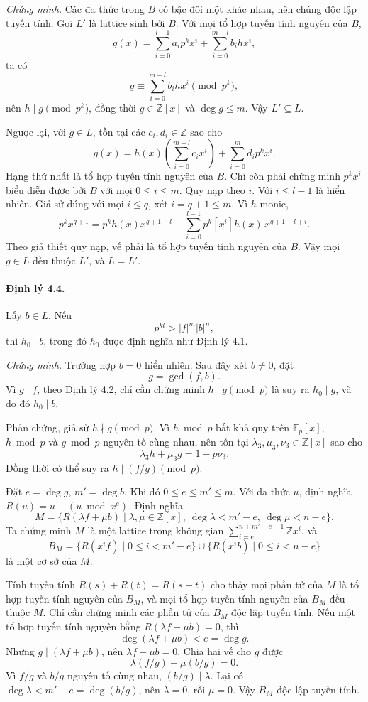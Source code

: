 \documentclass[11pt]{article}
\begin{document}
\emph{Chứng minh.}
Các đa thức trong \(B\) có bậc đôi một khác nhau, nên chúng độc lập tuyến tính.
Gọi \(L'\) là lattice sinh bởi \(B\). Với mọi tổ hợp tuyến tính nguyên của
\(B\),
\[
  g(x)=\sum_{i=0}^{l-1}a_ip^kx^i+\sum_{i=0}^{m-l}b_ihx^i,
\]
ta có
\[
  g\equiv \sum_{i=0}^{m-l}b_ihx^i\pmod {p^k},
\]
nên \(h\mid g\pmod {p^k}\), đồng thời \(g\in\mathbb Z[x]\) và
\(\deg g\le m\). Vậy \(L'\subseteq L\).

Ngược lại, với \(g\in L\), tồn tại các \(c_i,d_i\in\mathbb Z\) sao cho
\[
  g(x)=h(x)\left(\sum_{i=0}^{m-l}c_ix^i\right)+\sum_{i=0}^{m}d_ip^kx^i.
\]
Hạng thứ nhất là tổ hợp tuyến tính nguyên của \(B\). Chỉ còn phải chứng minh
\(p^kx^i\) biểu diễn được bởi \(B\) với mọi \(0\le i\le m\). Quy nạp theo
\(i\). Với \(i\le l-1\) là hiển nhiên. Giả sử đúng với mọi \(i\le q\), xét
\(i=q+1\le m\). Vì \(h\) monic,
\[
  p^kx^{q+1}
  =p^kh(x)x^{q+1-l}
   -\sum_{i=0}^{l-1}p^k[x^i]h(x)\,x^{q+1-l+i}.
\]
Theo giả thiết quy nạp, vế phải là tổ hợp tuyến tính nguyên của \(B\). Vậy mọi
\(g\in L\) đều thuộc \(L'\), và \(L=L'\).

\paragraph{Định lý 4.4.}
Lấy \(b\in L\). Nếu
\[
  p^{kl}>|f|^m|b|^n,
\]
thì \(h_0\mid b\), trong đó \(h_0\) được định nghĩa như Định lý 4.1.

\emph{Chứng minh.}
Trường hợp \(b=0\) hiển nhiên. Sau đây xét \(b\ne0\), đặt
\[
  g=\gcd(f,b).
\]
Vì \(g\mid f\), theo Định lý 4.2, chỉ cần chứng minh \(h\mid g\pmod p\) là suy
ra \(h_0\mid g\), và do đó \(h_0\mid b\).

Phản chứng, giả sử \(h\nmid g\pmod p\). Vì \(h\bmod p\) bất khả quy trên
\(\mathbb F_p[x]\), \(h\bmod p\) và \(g\bmod p\) nguyên tố cùng nhau, nên tồn
tại \(\lambda_3,\mu_3,\nu_3\in\mathbb Z[x]\) sao cho
\[
  \lambda_3h+\mu_3g=1-p\nu_3.
\]
Đồng thời có thể suy ra \(h\mid (f/g)\pmod p\).

Đặt \(e=\deg g\), \(m'=\deg b\). Khi đó \(0\le e\le m'\le m\). Với đa thức
\(u\), định nghĩa \(R(u)=u-(u\bmod x^e)\). Định nghĩa
\[
  M=\{R(\lambda f+\mu b)\mid
      \lambda,\mu\in\mathbb Z[x],\ \deg\lambda<m'-e,\ \deg\mu<n-e\}.
\]
Ta chứng minh \(M\) là một lattice trong không gian
\(\sum_{i=e}^{n+m'-e-1}\mathbb Zx^i\), và
\[
  B_M=\{R(x^if)\mid 0\le i<m'-e\}\cup
      \{R(x^ib)\mid 0\le i<n-e\}
\]
là một cơ sở của \(M\).

Tính tuyến tính \(R(s)+R(t)=R(s+t)\) cho thấy mọi phần tử của \(M\) là tổ hợp
tuyến tính nguyên của \(B_M\), và mọi tổ hợp tuyến tính nguyên của \(B_M\) đều
thuộc \(M\). Chỉ cần chứng minh các phần tử của \(B_M\) độc lập tuyến tính.
Nếu một tổ hợp tuyến tính nguyên bằng \(R(\lambda f+\mu b)=0\), thì
\[
  \deg(\lambda f+\mu b)<e=\deg g.
\]
Nhưng \(g\mid(\lambda f+\mu b)\), nên \(\lambda f+\mu b=0\). Chia hai vế cho
\(g\) được
\[
  \lambda(f/g)+\mu(b/g)=0.
\]
Vì \(f/g\) và \(b/g\) nguyên tố cùng nhau, \((b/g)\mid \lambda\). Lại có
\(\deg\lambda<m'-e=\deg(b/g)\), nên \(\lambda=0\), rồi \(\mu=0\). Vậy \(B_M\)
độc lập tuyến tính.
\end{document}
